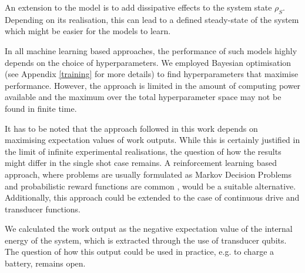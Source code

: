 An extension to the model is to add dissipative effects to the system state $\rho_S$.
Depending on its realisation, this can lead to a defined steady-state of the system which might be easier for the models to learn.

In all machine learning based approaches, the performance of such models highly depends on the choice of hyperparameters.
We employed Bayesian optimisation (see Appendix \ref{training} for more details) to find hyperparameters that maximise performance.
However, the approach is limited in the amount of computing power available and the maximum over the total hyperparameter space may not be found in finite time.


It has to be noted that the approach followed in this work depends on maximising expectation values of work outputs.
While this is certainly justified in the limit of infinite experimental realisations, the question of how the results might differ in the single shot case remains.
A reinforcement learning based approach, where problems are usually formulated as Markov Decision Problems and probabilistic reward functions are common \cite{Sutton1998}, would be a suitable alternative.
Additionally, this approach could be extended to the case of continuous drive and transducer functions.

We calculated the work output as the negative expectation value of the internal energy of the system, which is extracted through the use of transducer qubits.
The question of how this output could be used in practice, e.g. to charge a battery, remains open.